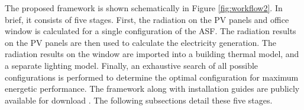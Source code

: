 

The proposed framework is shown schematically in Figure \ref{fig:workflow2}. In brief, it consists of five stages. First, the radiation on the PV panels and office window is calculated for a single configuration of the ASF. The radiation results on the PV panels are then used to calculate the electricity generation. The radiation results on the window are imported into a building thermal model, and a separate lighting model. Finally, an exhaustive search of all possible configurations is performed to determine the optimal configuration for maximum energetic performance. The framework along with installation guides are publicly available for download \cite{ASFGitHub,RCGitHub} . The following subsections detail these five stages.



